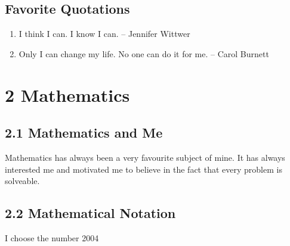 \documentclass[12pt]{article}
\begin{document}
\subsection*{Favorite Quotations}
\begin{enumerate}
    \item I think I can. I know I can. – Jennifer Wittwer
    \item Only I can change my life. No one can do it for me. – Carol Burnett
\end{enumerate}


\section*{2 Mathematics}

\subsection*{2.1 Mathematics and Me}
Mathematics has always been a very favourite subject of mine. It has always interested me and motivated me to believe in the fact that every problem is solveable.

\subsection*{2.2 Mathematical Notation}
I choose the number 2004 
\end{document}

